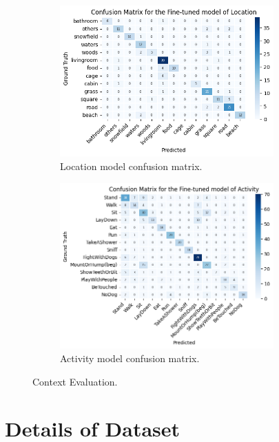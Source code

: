 \documentclass[letterpaper]{article}
\begin{document}
\begin{figure}[htb]
	\centering
	\begin{subfigure}[]{0.4\textwidth}
		\centering
		\includegraphics[width=0.9\textwidth]{images/location_cm.png}
		\caption{Location model confusion matrix.}
		\label{fig:context evaluation 1}
	\end{subfigure}
	\begin{subfigure}[]{0.4\textwidth}
		\centering
		\includegraphics[width=0.9\textwidth]{images/activity_cm.png}
		\caption{Activity model confusion matrix.}
		\label{fig:context evaluation 2}
	\end{subfigure}
\caption{Context Evaluation.}
\label{fig:context evaluation}
\end{figure}


\section{Details of Dataset}
\end{document}
